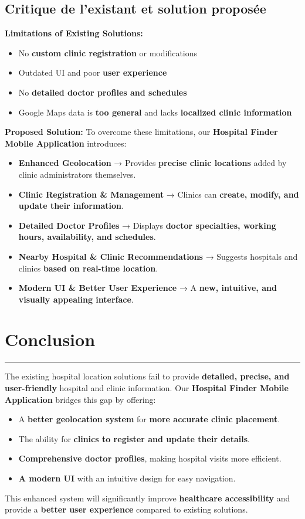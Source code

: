 \documentclass[12pt]{report}
\begin{document}
\subsection{\textbf{Critique de l’existant et solution proposée}}  

\textbf{Limitations of Existing Solutions:}  
\begin{itemize}
    \item No \textbf{custom clinic registration} or modifications  
    \item Outdated UI and poor \textbf{user experience}  
    \item No \textbf{detailed doctor profiles and schedules}  
    \item Google Maps data is \textbf{too general} and lacks \textbf{localized clinic information}  
\end{itemize}

\textbf{Proposed Solution:}  
To overcome these limitations, our \textbf{Hospital Finder Mobile Application} introduces:  
\begin{itemize}
    \item \textbf{Enhanced Geolocation} → Provides \textbf{precise clinic locations} added by clinic administrators themselves.  
    \item \textbf{Clinic Registration \& Management} → Clinics can \textbf{create, modify, and update their information}.  
    \item \textbf{Detailed Doctor Profiles} → Displays \textbf{doctor specialties, working hours, availability, and schedules}.  
    \item \textbf{Nearby Hospital \& Clinic Recommendations} → Suggests hospitals and clinics \textbf{based on real-time location}.  
    \item \textbf{Modern UI \& Better User Experience} → A \textbf{new, intuitive, and visually appealing interface}.  
\end{itemize}

\section{\textbf{Conclusion}}  
\rule{\linewidth}{1.5pt}  

The existing hospital location solutions fail to provide \textbf{detailed, precise, and user-friendly} hospital and clinic information. Our \textbf{Hospital Finder Mobile Application} bridges this gap by offering:  
\begin{itemize}
    \item A \textbf{better geolocation system} for \textbf{more accurate clinic placement}.  
    \item The ability for \textbf{clinics to register and update their details}.  
    \item \textbf{Comprehensive doctor profiles}, making hospital visits more efficient.  
    \item \textbf{A modern UI} with an intuitive design for easy navigation.  
\end{itemize}

This enhanced system will significantly improve \textbf{healthcare accessibility} and provide a \textbf{better user experience} compared to existing solutions.
\end{document}
